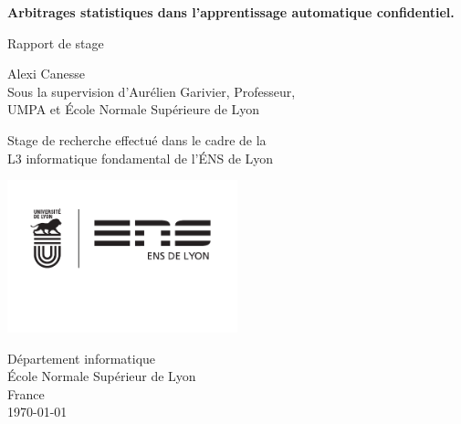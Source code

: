 \begin{titlepage}
    \begin{center}
        \vspace*{1cm}
            
        \Huge
        \textbf{Arbitrages statistiques dans l'apprentissage automatique confidentiel.}
            
        \vspace{0.5cm}
        \LARGE
        Rapport de stage
            
        \vspace{1.5cm}
            
        \huge {\sc Alexi Canesse}\\\LARGE
        Sous la supervision d'{\sc Aurélien Garivier}, Professeur,\\ UMPA et École Normale Supérieure de Lyon
            
        \vfill
            
        Stage de recherche effectué dans le cadre de la \\
        L3 informatique fondamental de l'ÉNS de Lyon
            
        \vspace{0.8cm}
            
        \includegraphics[width=0.5\textwidth]{"./proofs/figures/logo co UDL ENS 2016.pdf"}
            
        \Large
        Département informatique\\
        École Normale Supérieur de Lyon\\
        France\\
        \today
            
    \end{center}
\end{titlepage}





\newpage

\tableofcontents
\newpage

